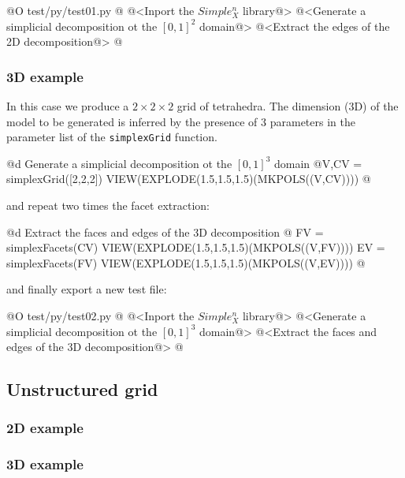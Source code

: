 \documentclass[11pt,oneside]{article}	%
\begin{document}
@O test/py/test01.py
@{
@<Inport the $Simple_X^n$ library@>
@<Generate a simplicial decomposition ot the $[0,1]^2$ domain@>
@<Extract the edges of the 2D decomposition@>
@}

\subsubsection{3D example}

In this case we produce a $2\times 2\times 2$ grid of tetrahedra. The dimension (3D) of the model to be generated is inferred by the presence of 3 parameters in the parameter list of the \texttt{simplexGrid} function. 

@d Generate a simplicial decomposition ot the $[0,1]^3$ domain
@{V,CV = simplexGrid([2,2,2])
VIEW(EXPLODE(1.5,1.5,1.5)(MKPOLS((V,CV))))
@}

and repeat two times the facet extraction:

@d Extract the faces and edges of the 3D decomposition
@{
FV = simplexFacets(CV)
VIEW(EXPLODE(1.5,1.5,1.5)(MKPOLS((V,FV))))
EV = simplexFacets(FV)
VIEW(EXPLODE(1.5,1.5,1.5)(MKPOLS((V,EV))))
@}

and finally export a new test file:

@O test/py/test02.py 
@{
@<Inport the $Simple_X^n$ library@>
@<Generate a simplicial decomposition ot the $[0,1]^3$ domain@>
@<Extract the faces and edges of the 3D decomposition@>
@}


\subsection{Unstructured grid}


\subsubsection{2D example}


\subsubsection{3D example}





\end{document}
